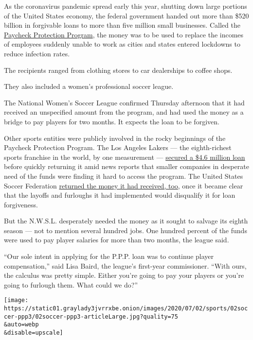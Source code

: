 As the coronavirus pandemic spread early this year, shutting down large
portions of the United States economy, the federal government handed out
more than \$520 billion in forgivable loans to more than five million
small businesses. Called the
\href{https://www.nytimes3xbfgragh.onion/2020/07/06/us/ppp-small-business-loans.html}{Paycheck
Protection Program}, the money was to be used to replace the incomes of
employees suddenly unable to work as cities and states entered lockdowns
to reduce infection rates.

The recipients ranged from clothing stores to car dealerships to coffee
shops.

They also included a women's professional soccer league.

The National Women's Soccer League confirmed Thursday afternoon that it
had received an unspecified amount from the program, and had used the
money as a bridge to pay players for two months. It expects the loan to
be forgiven.

Other sports entities were publicly involved in the rocky beginnings of
the Paycheck Protection Program. The Los Angeles Lakers --- the
eighth-richest sports franchise in the world, by one measurement ---
\href{https://www.nytimes3xbfgragh.onion/2020/04/28/us/politics/coronavirus-treasury-payment-protection-program.html}{secured
a \$4.6 million loan} before quickly returning it amid news reports that
smaller companies in desperate need of the funds were finding it hard to
access the program. The United States Soccer Federation
\href{https://www.espn.com/soccer/united-states-usa/story/4095017/us-soccer-returns-paycheck-protection-loan-to-us-treasury}{returned
the money it had received, too}, once it became clear that the layoffs
and furloughs it had implemented would disqualify it for loan
forgiveness.

But the N.W.S.L. desperately needed the money as it sought to salvage
its eighth season --- not to mention several hundred jobs. One hundred
percent of the funds were used to pay player salaries for more than two
months, the league said.

``Our sole intent in applying for the P.P.P. loan was to continue player
compensation,'' said Lisa Baird, the league's first-year commissioner.
``With ours, the calculus was pretty simple. Either you're going to pay
your players or you're going to furlough them. What could we do?''

\texttt{[image: https://static01.graylady3jvrrxbe.onion/images/2020/07/02/sports/02soccer-ppp3/02soccer-ppp3-articleLarge.jpg?quality=75\\\&auto=webp\\\&disable=upscale]}

